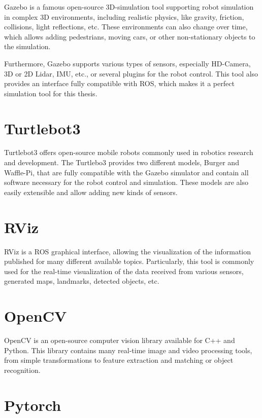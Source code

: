 Gazebo is a famous open-source 3D-simulation tool supporting robot simulation in complex 3D environments, including realistic physics, like gravity, friction, collisions, light reflections, etc. These environments can also change over time, which allows adding pedestrians, moving cars, or other non-stationary objects to the simulation.\par
Furthermore, Gazebo supports various types of sensors, especially HD-Camera, 3D or 2D Lidar, IMU, etc., or several plugins for the robot control. This tool also provides an interface fully compatible with ROS, which makes it a perfect simulation tool for this thesis.

\section{Turtlebot3}

Turtlebot3 offers open-source mobile robots commonly used in robotics research and development. The Turtlebo3 provides two different models, Burger and Waffle-Pi, that are fully compatible with the Gazebo simulator and contain all software necessary for the robot control and simulation. These models are also easily extensible and allow adding new kinds of sensors.

\section{RViz}

RViz is a ROS graphical interface, allowing the visualization of the information published for many different available topics. Particularly, this tool is commonly used for the real-time visualization of the data received from various sensors, generated maps, landmarks, detected objects, etc.

\section{OpenCV}

OpenCV is an open-source computer vision library available for C++ and Python. This library contains many real-time image and video processing tools, from simple transformations to feature extraction and matching or object recognition.

\section{Pytorch}

